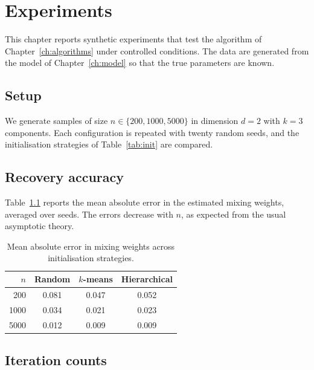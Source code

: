 \chapter{Experiments}\label{ch:experiments}

This chapter reports synthetic experiments that test the algorithm of
Chapter~\ref{ch:algorithms} under controlled conditions. The data are generated
from the model of Chapter~\ref{ch:model} so that the true parameters are known.

\section{Setup}\label{sec:setup}

We generate samples of size $n\in\{200,1000,5000\}$ in dimension $d=2$ with
$k=3$ components. Each configuration is repeated with twenty random seeds, and
the initialisation strategies of Table~\ref{tab:init} are compared.

\lipsum[35-36]

\section{Recovery accuracy}\label{sec:recovery}

Table~\ref{tab:recovery} reports the mean absolute error in the estimated
mixing weights, averaged over seeds. The errors decrease with $n$, as expected
from the usual asymptotic theory.

\begin{table}[ht]
  \centering
  \begin{tabular}{rccc}
    \toprule
    $n$ & Random & $k$-means & Hierarchical \\
    \midrule
    200  & 0.081 & 0.047 & 0.052 \\
    1000 & 0.034 & 0.021 & 0.023 \\
    5000 & 0.012 & 0.009 & 0.009 \\
    \bottomrule
  \end{tabular}
  \caption{Mean absolute error in mixing weights across initialisation strategies.}
  \label{tab:recovery}
\end{table}

\lipsum[37-38]

\section{Iteration counts}\label{sec:iterations}

